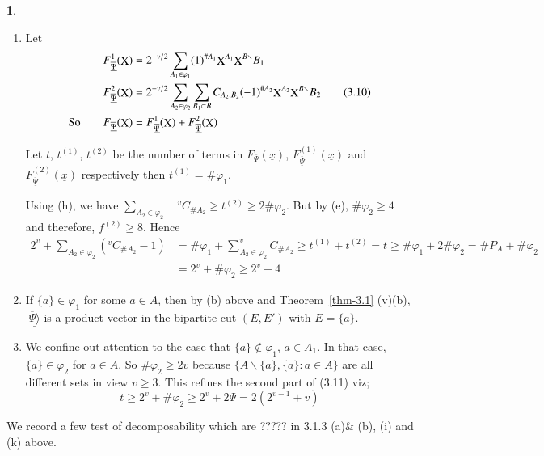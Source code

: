\documentclass[a4paper,12pt]{article}
\DeclareMathOperator{\x}{\mathrm{X}}
\theoremstyle{definition}
\theoremstyle{underlinethm}
\theoremstyle{definition}
\newtheorem{subsubsec}{}[subsection]
\begin{document}
\begin{subsubsec}
\begin{enumerate}[label=(\alph*)]
\item Let 
\begin{align*}
F^{1}_{\underline{\overline{\Psi}}}(\bold{\x})  &= 2^{-v/2} \sum_{A_{1} \in \varphi_{1}}(1)^{\# A_{1}} \bold{\x}^{A_{1}} \bold{\x}^{B\smallsetminus} B_{1}\\
F^{2}_{\underline{\overline{\Psi}}}(\bold{\x})  &= 2^{-v/2} \sum_{A_{2} \in \varphi_{2}} \sum_{B_{1} \subset B} C_{A_{2}, B_{2}}(-1)^{\# A_{2}} \bold{\x}^{A_{2}} \bold{\x}^{B\smallsetminus}B_{2}\tag{3.10}\\
\text{So}\quad\quad F_{\underline{\overline{\Psi}}} (\bold{\x}) &= F^{1}_{\underline{\overline{\Psi}}} (\bold{\x}) + F^{2}_{\underline{\overline{\Psi}}} (\bold{\x})
\end{align*}

Let $t$, $t^{(1)}$, $t^{(2)}$ be the number of terms in $F_{\underline{\overline{\Psi}}}(\underline{x})$, $F^{(1)}_{\underline{\overline{\Psi}}}(\underline{x})$ and $F^{(2)}_{\underline{\overline{\Psi}}}(\underline{x})$ respectively then $t^{(1)} = \# \varphi_{1}$.

Using (h), we have $\sum_{A_{2} \in \varphi_{2}} \quad ^{v}C_{\# A_{2}} \geq t^{(2)} \geq 2 \# \varphi_{2}$. But by (e), $\# \varphi_{2} \geq 4$  and therefore, $f^{(2)} \geq 8$. Hence 
\begin{align*}
2^ {v} + \sum_{A_{2} \in \varphi_{2}}(^{v}C_{\# A_{2}}-1) &= \# \varphi_{1} + \sum_{A_{2} \in \varphi_{2}} ^{v}C_{\# A_{2}} \geq t^{(1)} + t^{(2)} = t \geq \# \varphi_{1} + 2 \# \varphi_{2} = \#P_{A} + \# \varphi_{2}\\
& = 2^{v} + \# \varphi_{2} \geq 2^{v} + 4 \tag{3.11}  
\end{align*}

\item If $\{a\} \in \varphi_{1}$ for some $a\in A$, then by (b) above and Theorem~\ref{thm-3.1} (v)(b), $|\underline{\overline{\Psi} \rangle}$ is a product vector in the bipartite cut $(E, E')$ with $E= \{a\}$.

\item We confine out attention to the case that $\{a\} \notin \varphi_{1}$, $a\in A_{1}$. In that case, $\{a\} \in \varphi_{2}$ for $a\in A$. So $\# \varphi_{2} \geq 2v$ because $\{A \smallsetminus \{a\}, \{a\} : a \in A \}$ are all different sets in view $v \geq 3$. This refines the second part of (3.11) viz; 
\begin{equation*}
t \geq 2^{v} + \# \varphi_{2} \geq 2^{v} + 2 \Psi = 2(2^{v-1} + v)\tag{3.12} 
\end{equation*} 

\end{enumerate}

We record a few test of decomposability which are ????? in 3.1.3 (a)\& (b), (i) and (k) above.

\end{subsubsec}
\end{document}
